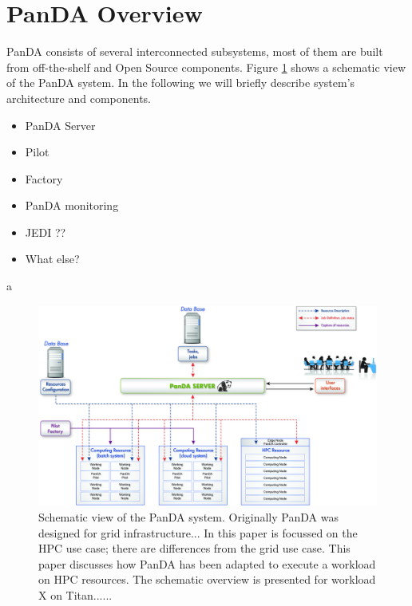\documentclass[10pt, conference, compsocconf]{IEEEtran}
\begin{document}
\section{PanDA Overview}\label{sec:panda_overview}
PanDA consists of several interconnected subsystems, most of them are built from off-the-shelf and Open Source components. Figure \ref{fig:architecture} shows a schematic view of the PanDA system.
In the following we will briefly describe system’s architecture and components.

\begin{itemize}
\item PanDA Server
\item Pilot
\item Factory
\item PanDA monitoring
\item JEDI ??
\item What else?
\end{itemize}
a

\begin{figure}
\begin{center}
\includegraphics[width=\columnwidth]{figures/PandaArch.jpg}
\caption{Schematic view of the PanDA system\label{fig:architecture}. 
  Originally PanDA was designed for grid infrastructure... In this paper
  is focussed on the HPC use case; there are differences from  the grid use
  case. This paper discusses how PanDA has been adapted to execute a workload on
  HPC resources. The schematic overview is presented for workload X on Titan......}
\end{center}
\end{figure}
\end{document}
